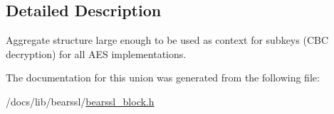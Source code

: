 \subsection{Detailed Description}
Aggregate structure large enough to be used as context for subkeys (C\+BC decryption) for all A\+ES implementations. 

The documentation for this union was generated from the following file\+:\begin{DoxyCompactItemize}
\item 
/docs/lib/bearssl/\hyperlink{bearssl__block_8h}{bearssl\+\_\+block.\+h}\end{DoxyCompactItemize}
